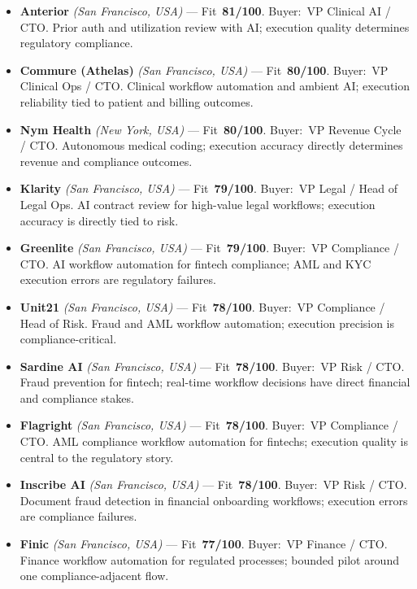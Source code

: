 \documentclass[10pt]{article}
\newcommand{\cand}[5]{\item \textbf{#1} \textit{(#2)} --- Fit~\textbf{#3/100}. Buyer:~#4. #5}
\begin{document}
\begin{itemize}
\cand{Anterior}{San Francisco, USA}{81}{VP Clinical AI / CTO}{Prior auth and utilization review with AI; execution quality determines regulatory compliance.}
\cand{Commure (Athelas)}{San Francisco, USA}{80}{VP Clinical Ops / CTO}{Clinical workflow automation and ambient AI; execution reliability tied to patient and billing outcomes.}
\cand{Nym Health}{New York, USA}{80}{VP Revenue Cycle / CTO}{Autonomous medical coding; execution accuracy directly determines revenue and compliance outcomes.}
\cand{Klarity}{San Francisco, USA}{79}{VP Legal / Head of Legal Ops}{AI contract review for high-value legal workflows; execution accuracy is directly tied to risk.}
\cand{Greenlite}{San Francisco, USA}{79}{VP Compliance / CTO}{AI workflow automation for fintech compliance; AML and KYC execution errors are regulatory failures.}
\cand{Unit21}{San Francisco, USA}{78}{VP Compliance / Head of Risk}{Fraud and AML workflow automation; execution precision is compliance-critical.}
\cand{Sardine AI}{San Francisco, USA}{78}{VP Risk / CTO}{Fraud prevention for fintech; real-time workflow decisions have direct financial and compliance stakes.}
\cand{Flagright}{San Francisco, USA}{78}{VP Compliance / CTO}{AML compliance workflow automation for fintechs; execution quality is central to the regulatory story.}
\cand{Inscribe AI}{San Francisco, USA}{78}{VP Risk / CTO}{Document fraud detection in financial onboarding workflows; execution errors are compliance failures.}
\cand{Finic}{San Francisco, USA}{77}{VP Finance / CTO}{Finance workflow automation for regulated processes; bounded pilot around one compliance-adjacent flow.}
\end{itemize}
\end{document}
